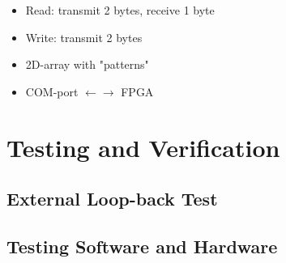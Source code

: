 \documentclass[aspectratio=43]{beamer}
\makeatletter
\newenvironment{backgroundblock}[2]{%
  \global\setbox\@backgroundblock=\vbox\bgroup%
    \unvbox\@backgroundblock%
    \vbox to0pt\bgroup\vskip#2\hbox to0pt\bgroup\hskip#1\relax%
}{\egroup\egroup\egroup}
\makeatother
\begin{document}
{\begin{frame}[t]
\begin{itemize}
\item Read: transmit 2 bytes, receive 1 byte
\item Write: transmit 2 bytes
\item 2D-array with "patterns"
\item COM-port $\leftarrow\rightarrow$ FPGA
\end{itemize}

\end{frame}


\section{Testing and Verification}
\subsection{External Loop-back Test}
\subsection{Testing Software and Hardware}

}
\end{document}
